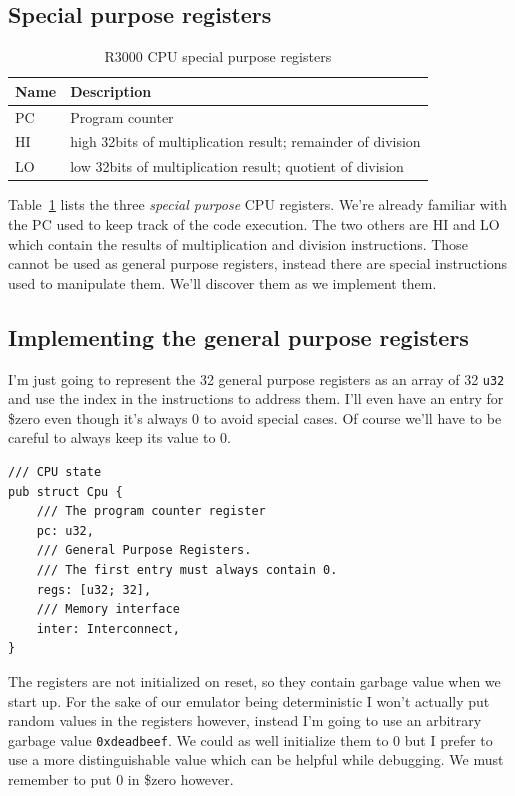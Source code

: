 \documentclass[a4paper]{article}
\newcommand{\code}[1] {\texttt{#1}}
\begin{document}
\subsection{Special purpose registers}

\begin{table}[ht]
  \centering

  \begin{tabular}{ l | l }
    Name        & Description     \\
    \hline
    PC          & Program counter \\
    HI          & high 32bits of multiplication result; remainder of
                  division \\
    LO          & low 32bits of multiplication result; quotient of
                  division \\
  \end{tabular}

  \caption{R3000 CPU special purpose registers}
  \label{tab:specialcpuregs}
\end{table}

Table~\ref{tab:specialcpuregs} lists the three \emph{special purpose}
CPU registers. We're already familiar with the PC used to keep track
of the code execution. The two others are HI and LO which contain the
results of multiplication and division instructions. Those cannot be
used as general purpose registers, instead there are special
instructions used to manipulate them. We'll discover them as we
implement them.

\subsection{Implementing the general purpose registers}

I'm just going to represent the 32 general purpose registers as an
array of 32 \code{u32} and use the index in the instructions to
address them. I'll even have an entry for \$zero even though it's
always 0 to avoid special cases. Of course we'll have
to be careful to always keep its value to 0.

\begin{lstlisting}
/// CPU state
pub struct Cpu {
    /// The program counter register
    pc: u32,
    /// General Purpose Registers.
    /// The first entry must always contain 0.
    regs: [u32; 32],
    /// Memory interface
    inter: Interconnect,
}
\end{lstlisting}

The registers are not initialized on reset, so they contain garbage
value when we start up. For the sake of our emulator being
deterministic I won't actually put random values in the registers
however, instead I'm going to use an arbitrary garbage value
\code{0xdeadbeef}. We could as well initialize them to 0 but I
prefer to use a more distinguishable value which can be helpful while
debugging. We must remember to put 0 in \$zero however.
\end{document}

